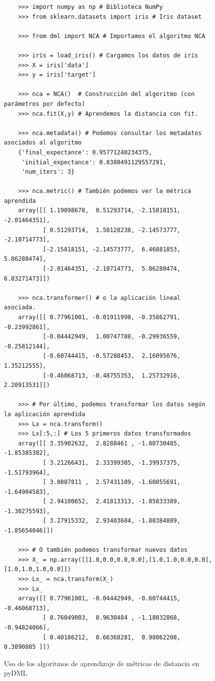 \begin{figure}[h]
\begin{verbatim}
    >>> import numpy as np # Biblioteca NumPy
    >>> from sklearn.datasets import iris # Iris dataset

    >>> from dml import NCA # Importamos el algoritmo NCA

    >>> iris = load_iris() # Cargamos los datos de iris
    >>> X = iris['data']
    >>> y = iris['target']

    >>> nca = NCA()  # Construcción del algoritmo (con parámetros por defecto)
    >>> nca.fit(X,y) # Aprendemos la distancia con fit.

    >>> nca.metadata() # Podemos consultar los metadatos asociados al algoritmo
    {'final_expectance': 0.95771240234375,
     'initial_expectance': 0.8380491129557291,
     'num_iters': 3}

    >>> nca.metric() # También podemos ver la métrica aprendida
    array([[ 1.19098678,  0.51293714, -2.15818151, -2.01464351],
           [ 0.51293714,  1.58128238, -2.14573777, -2.10714773],
           [-2.15818151, -2.14573777,  6.46881853,  5.86280474],
           [-2.01464351, -2.10714773,  5.86280474,  6.83271473]])

    >>> nca.transformer() # o la aplicación lineal asociada.
    array([[ 0.77961001, -0.01911998, -0.35862791, -0.23992861],
           [-0.04442949,  1.00747788, -0.29936559, -0.25812144],
           [-0.60744415, -0.57288453,  2.16095076,  1.35212555],
           [-0.46068713, -0.48755353,  1.25732916,  2.20913531]])

    >>> # Por último, podemos transformar los datos según la aplicación aprendida
    >>> Lx = nca.transform()
    >>> Lx[:5,:] # Los 5 primeros datos transformados
    array([[ 3.35902632,  2.8288461 , -1.80730485, -1.85385382],
           [ 3.21266431,  2.33399305, -1.39937375, -1.51793964],
           [ 3.0887811 ,  2.57431109, -1.60855691, -1.64904583],
           [ 2.94100652,  2.41813313, -1.05833389, -1.30275593],
           [ 3.27915332,  2.93403684, -1.80384889, -1.85654046]])

    >>> # O también podemos transformar nuevos datos
    >>> X_ = np.array([[1.0,0.0,0.0,0.0],[1.0,1.0,0.0,0.0],[1.0,1.0,1.0,0.0]])
    >>> Lx_ = nca.transform(X_)
    >>> Lx_
    array([[ 0.77961001, -0.04442949, -0.60744415, -0.46068713],
           [ 0.76049003,  0.9630484 , -1.18032868, -0.94824066],
           [ 0.40186212,  0.66368281,  0.98062208,  0.3090885 ]])

\end{verbatim}
\caption{Uso de los algoritmos de aprendizaje de métricas de distancia en pyDML} \label{fig:ex_dml}
\end{figure}

